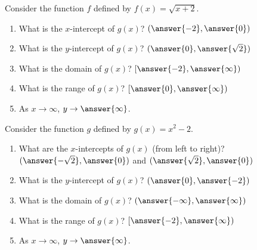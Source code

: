 \documentclass{ximera}
\author{Kenneth Berglund}
\begin{document}
\begin{exercise}
Consider the function $f$ defined by $f(x) = \sqrt{x + 2}$.
\begin{enumerate}
\item What is the $x$-intercept of $g(x)$? $(\answer{-2}, \answer{0})$
\item What is the $y$-intercept of $g(x)$? $(\answer{0}, \answer{\sqrt{2}})$
\item What is the domain of $g(x)$? $[\answer{-2}, \answer{\infty})$
\item What is the range of $g(x)$? $[\answer{0}, \answer{\infty})$
\item As $x \to \infty$, $y \to \answer{\infty}$.
\end{enumerate}

\end{exercise}

\begin{exercise}
Consider the function $g$ defined by $g(x) = x^2 - 2$.
\begin{enumerate}
\item What are the $x$-intercepts of $g(x)$ (from left to right)? $(\answer{-\sqrt{2}}, \answer{0})$ and $(\answer{\sqrt{2}}, \answer{0})$
\item What is the $y$-intercept of $g(x)$? $(\answer{0}, \answer{-2})$
\item What is the domain of $g(x)$? $(\answer{-\infty}, \answer{\infty})$
\item What is the range of $g(x)$? $[\answer{-2}, \answer{\infty})$
\item As $x \to \infty$, $y \to \answer{\infty}$.
\end{enumerate}

\end{exercise}
\end{document}
